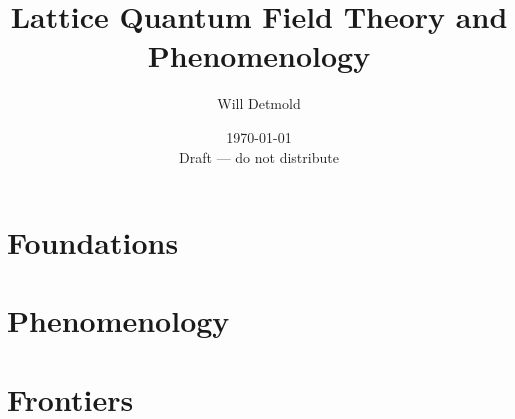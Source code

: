 \documentclass[11pt]{book}
\begin{document}
\frontmatter
\title{Lattice Quantum Field Theory and Phenomenology}
\author{Will Detmold}
\date{\today\\[2mm]\normalsize Draft --- do not distribute}
\maketitle

\tableofcontents

\mainmatter
\part{Foundations}














\part{Phenomenology}
\label{part:pheno}









\part{Frontiers}





\backmatter


\printindex
\end{document}
